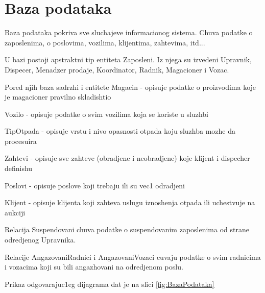 \documentclass[10 pt]{article}
\begin{document}
	
	\section{Baza podataka}
		Baza podataka pokriva sve sluchajeve informacionog sistema. Chuva podatke o zaposlenima, o poslovima, vozilima, klijentima, zahtevima, itd...
		
		U bazi postoji apstraktni tip entiteta Zaposleni. Iz njega su izvedeni Upravnik, Dispecer, Menadzer prodaje, Koordinator, Radnik, Magacioner i Vozac.
		
		Pored njih baza sadrzhi i entitete 
		Magacin - opisuje podatke o proizvodima koje je magacioner pravilno skladishtio
		
		Vozilo - opisuje podatke o svim vozilima koja se koriste u sluzhbi
		
		TipOtpada - opisuje vrstu i nivo opasnosti otpada koju sluzhba mozhe da procesuira
		
		Zahtevi - opisuje sve zahteve (obradjene i neobradjene) koje klijent i dispecher definishu
		
		Poslovi - opisuje poslove koji trebaju ili su vec1 odradjeni
		
		Klijent - opisuje klijenta koji zahteva uslugu iznoshenja otpada ili uchestvuje na aukciji
		
		Relacija Suspendovani chuva podatke o suspendovanim zaposlenima od strane odredjenog Upravnika.
		
		Relacije AngazovaniRadnici i AngazovaniVozaci cuvaju podatke o svim radnicima i vozacima koji su bili angazhovani na odredjenom poslu.
		
		
		Prikaz odgovarajuc1eg dijagrama dat je na slici \ref{fig:BazaPodataka}
		
\end{document}
